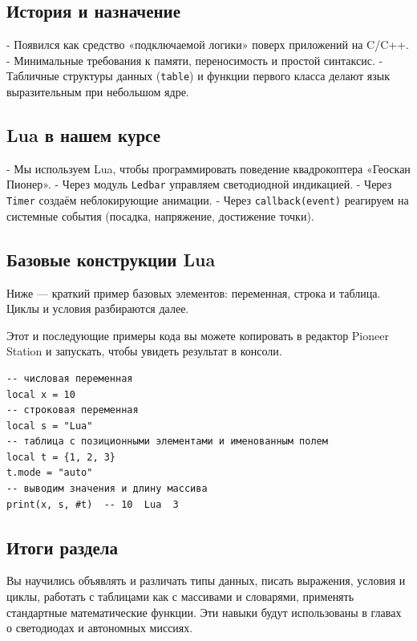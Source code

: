 \subsection{История и назначение}
- Появился как средство «подключаемой логики» поверх приложений на C/C++.
- Минимальные требования к памяти, переносимость и простой синтаксис.
- Табличные структуры данных (\verb|table|) и функции первого класса делают язык выразительным при небольшом ядре.

\subsection{Lua в нашем курсе}
- Мы используем Lua, чтобы программировать поведение квадрокоптера «Геоскан Пионер».
- Через модуль \verb|Ledbar| управляем светодиодной индикацией.
- Через \verb|Timer| создаём неблокирующие анимации.
- Через \verb|callback(event)| реагируем на системные события (посадка, напряжение, достижение точки).

\subsection{Базовые конструкции Lua}
Ниже — краткий пример базовых элементов: переменная, строка и таблица. Циклы и условия разбираются далее.
\begin{infobox}[Практика]
    Этот и последующие примеры кода вы можете копировать в редактор Pioneer Station и запускать, чтобы увидеть результат в консоли.
\end{infobox}
\begin{verbatim}
-- числовая переменная
local x = 10
-- строковая переменная
local s = "Lua"
-- таблица с позиционными элементами и именованным полем
local t = {1, 2, 3}
t.mode = "auto"
-- выводим значения и длину массива
print(x, s, #t)  -- 10  Lua  3
\end{verbatim}
\subsection*{Итоги раздела}
Вы научились объявлять и различать типы данных, писать выражения, условия и циклы, работать с таблицами как с массивами и словарями, применять стандартные математические функции. Эти навыки будут использованы в главах о светодиодах и автономных миссиях.
